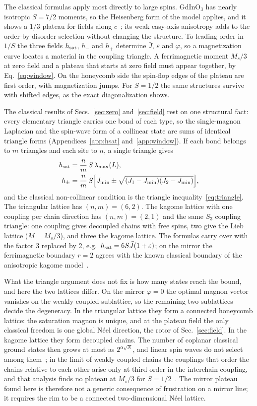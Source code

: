 \documentclass[prb,twocolumn,superscriptaddress,amsmath,amssymb,floatfix]{revtex4-2}
\newcommand{\Jb}{\bar J}
\begin{document}
The classical formulas apply most directly to large spins. GdInO$_3$ has nearly isotropic $S=7/2$ moments, so the Heisenberg form of the model applies, and it shows a $1/3$ plateau for fields along $c$~\cite{Yuan2023}; its weak easy-axis anisotropy adds to the order-by-disorder selection without changing the structure. To leading order in $1/S$ the three fields $h_{\rm sat}$, $h_-$ and $h_+$ determine $\Jb$, $\varepsilon$ and $\varphi$, so a magnetization curve locates a material in the coupling triangle. A ferrimagnetic moment $M_s/3$ at zero field and a plateau that starts at zero field must appear together, by Eq.~\eqref{eq:window}. On the honeycomb side the spin-flop edges of the plateau are first order, with magnetization jumps. For $S=1/2$ the same structures survive with shifted edges, as the exact diagonalization shows.

The classical results of Secs.~\ref{sec:zero} and~\ref{sec:field} rest on one structural fact: every elementary triangle carries one bond of each type, so the single-magnon Laplacian and the spin-wave form of a collinear state are sums of identical triangle forms (Appendices~\ref{app:hsat} and~\ref{app:window}). If each bond belongs to $m$ triangles and each site to $n$, a single triangle gives
\begin{align}
h_{\rm sat}&=\frac nm\,S\,\lambda_{\max}(L),\nonumber\\
h_\pm&=\frac nm\,S\Big[J_{\min}\pm\sqrt{(J_1-J_{\min})(J_2-J_{\min})}\Big],
\end{align}
and the classical non-collinear condition is the triangle inequality~\eqref{eq:triangle}. The triangular lattice has $(n,m)=(6,2)$. The kagome lattice with one coupling per chain direction has $(n,m)=(2,1)$ and the same $S_3$ coupling triangle: one coupling gives decoupled chains with free spins, two give the Lieb lattice ($M=M_s/3$), and three the kagome lattice. The formulas carry over with the factor 3 replaced by 2, e.g.\ $h_{\rm sat}=6S\Jb(1+\varepsilon)$; on the mirror the ferrimagnetic boundary $r=2$ agrees with the known classical boundary of the anisotropic kagome model~\cite{Yavorskii2007}.

What the triangle argument does not fix is how many states reach the bound, and here the two lattices differ. On the mirror $\varphi=0$ the optimal magnon vector vanishes on the weakly coupled sublattice, so the remaining two sublattices decide the degeneracy. In the triangular lattice they form a connected honeycomb lattice: the saturation magnon is unique, and at the plateau field the only classical freedom is one global N\'eel direction, the rotor of Sec.~\ref{sec:field}. In the kagome lattice they form decoupled chains. The number of coplanar classical ground states then grows at most as $2^{\alpha\sqrt N}$, and linear spin waves do not select among them~\cite{Yavorskii2007}; in the limit of weakly coupled chains the couplings that order the chains relative to each other arise only at third order in the interchain coupling, and that analysis finds no plateau at $M_s/3$ for $S=1/2$~\cite{Stoudenmire2008}. The mirror plateau found here is therefore not a generic consequence of frustration on a mirror line; it requires the rim to be a connected two-dimensional N\'eel lattice.
\end{document}

